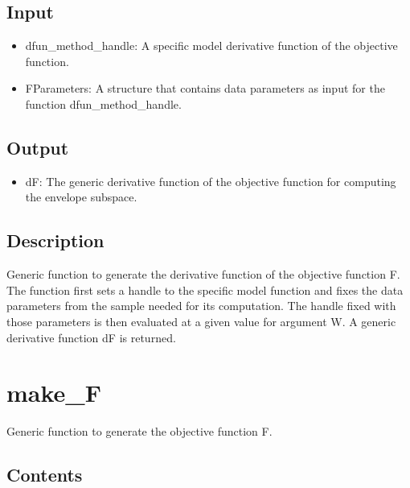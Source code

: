 \documentclass[a4paper,11pt,openany]{memoir}
\begin{document}
\subsection*{Input}

\begin{itemize}
\setlength{\itemsep}{-1ex}
   \item dfun\_method\_handle: A specific model derivative function of the objective function.
   \item FParameters: A structure that contains data parameters as input for the function dfun\_method\_handle.
\end{itemize}


\subsection*{Output}

\begin{itemize}
\setlength{\itemsep}{-1ex}
   \item dF: The generic derivative function of the objective function for computing the envelope subspace.
\end{itemize}


\subsection*{Description}

\begin{par}
Generic function to generate the derivative function of the objective function F. The function first sets a handle to the specific model function and fixes the data parameters from the sample needed for its computation. The handle fixed with those parameters is then evaluated at a given value for argument W. A generic derivative function dF is returned.
\end{par} \vspace{1em}

\newpage

\rmfamily
\color{black}\section{make\_F}

\begin{par}
Generic function to generate the objective function F.
\end{par} \vspace{1em}

\subsection*{Contents}
\end{document}
